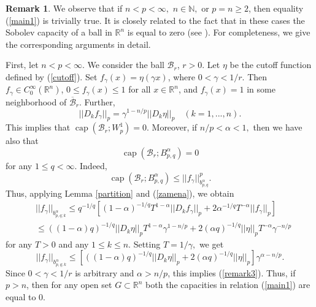 \documentclass[12pt,twoside,reqno]{amsart}
\numberwithin{equation}{section}
\theoremstyle{definition}
\newtheorem{rem}[teo]{Remark}
\numberwithin{equation}{section}
\begin{document}
\begin{rem}\label{REMARK2} We observe that if $n<p<\infty, \,\, n\in{\mathbb{N}},$ or $p=n\ge 2$, then equality (\ref{main1}) is
trivially true. It is closely related to the fact that in these
cases the Sobolev capacity of a ball in ${\mathbb{R}}^n$ is equal to zero (see
\cite[p. 148]{Maz2}). For completeness, we give the corresponding
arguments in detail.

First, let $n<p<\infty.$ We consider the ball $\mathcal B_r$, $r>0.$
Let $\eta$ be the cutoff function defined by (\ref{cutoff}). Set
$f_{\gamma }(x)=\eta(\gamma x)$, where $0<\gamma<1/r.$ Then $f_{\gamma }\in
C_0^\infty({\mathbb{R}}^n)$, $0\le f_{\gamma }(x)\le 1$ for all $x\in{\mathbb{R}}^n$, and
$f_{\gamma }(x)=1$ in some neighborhood of  $\overline{\mathcal B}_r.$ Further,
\begin{equation}\label{zamena}
||D_k f_{\gamma }||_p={\gamma }^{1-n/p}||D_k \eta||_p\quad (k=1,...,n).
\end{equation}
This implies that ${\operatorname{cap}} (\mathcal B_r; W_p^1)=0$. Moreover, if
$n/p<{\alpha}<1,$ then we have also that
\begin{equation}\label{remark3}
{\operatorname{cap}}(\mathcal B_r; B_{p,q}^{\alpha})=0
\end{equation}
for any $1\le q<\infty$. Indeed,
$$
{\operatorname{cap}}(\mathcal B_r; B_{p,q}^{\alpha})\le ||f_{\gamma }||_{b_{p,q}^{\alpha}}^p.
$$
Thus, applying Lemma \ref{partition} and (\ref{zamena}),
we obtain
$$
\begin{aligned}
&||f_{\gamma }||_{b_{p,q;k}^{\alpha}}\le  q^{-1/q}\left[(1-{\alpha})^{-1/q}T^{1-{\alpha}}||D_kf_{\gamma }||_p+2{\alpha}^{-1/q}T^{-{\alpha} }||f_{\gamma }||_p\right] \\
&\le  ((1-{\alpha})q)^{-1/q}||D_k \eta||_p T^{1-{\alpha}}\gamma^{1-n/p} + 2({\alpha} q)^{-1/q}||\eta||_p T^{-{\alpha} } \gamma^{-n/p}
\end{aligned}
$$
for any $T>0$ and any $1\le k\le n$. Setting $T=1/\gamma,$ we get
$$
||f_{\gamma }||_{b_{p,q;k}^{\alpha}}\le \left[((1-{\alpha})q)^{-1/q}||D_k \eta||_p + 2({\alpha} q)^{-1/q}||\eta||_p\right]{\gamma }^{{\alpha}-n/p}.
$$
 Since $0<{\gamma }<1/r$ is arbitrary and ${\alpha}>n/p$, this implies (\ref{remark3}). Thus, if $p>n$, then for any open set $G\subset {\mathbb{R}}^n$ both the capacities in relation (\ref{main1}) are equal to 0.


\end{rem}
\end{document}
